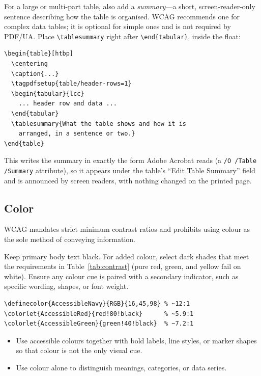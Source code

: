  For a large or multi-part table, also add a
\emph{summary}---a short, screen-reader-only sentence describing how the table
is organised. WCAG recommends one for complex data tables; it is optional for
simple ones and is not required by PDF/UA. Place \texttt{\textbackslash tablesummary}
right after \texttt{\textbackslash end\{tabular\}}, inside the float:

\begin{Verbatim}
\begin{table}[htbp]
  \centering
  \caption{...}
  \tagpdfsetup{table/header-rows=1}
  \begin{tabular}{lcc}
    ... header row and data ...
  \end{tabular}
  \tablesummary{What the table shows and how it is
    arranged, in a sentence or two.}
\end{table}
\end{Verbatim}

This writes the summary in exactly the form Adobe Acrobat reads (a
\texttt{/O /Table /Summary} attribute), so it appears under the table's
\enquote{Edit Table Summary} field and is announced by screen readers, with
nothing changed on the printed page.

\subsection{Color}
\label{subsec:colour}

 WCAG mandates strict minimum contrast ratios and prohibits using colour as the sole method of conveying information. 

 Keep primary body text black. For added colour, select dark shades that meet the requirements in Table~\ref{tab:contrast} (pure red, green, and yellow fail on white). Ensure any colour cue is paired with a secondary indicator, such as specific wording, shapes, or font weight.

\begin{Verbatim}
\definecolor{AccessibleNavy}{RGB}{16,45,98} % ~12:1
\colorlet{AccessibleRed}{red!80!black}      % ~5.9:1
\colorlet{AccessibleGreen}{green!40!black}  % ~7.2:1
\end{Verbatim}

\begin{itemize}
    \item {} Use accessible colours together with bold labels, line styles, or marker shapes so that colour is not the only visual cue.
    \item {} Use colour alone to distinguish meanings, categories, or data series.
\end{itemize}


